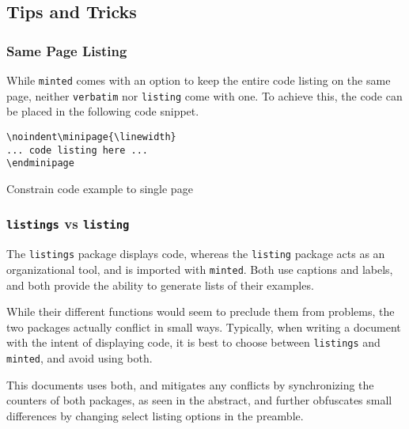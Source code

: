 
\subsection{Tips and Tricks}

\subsubsection{Same Page Listing}

While \verb|minted| comes with an option to keep the entire code listing on the same page, neither \verb|verbatim| nor \verb|listing| come with one. To achieve this, the code can be placed in the following code snippet.

\begin{listing}[H]
\begin{verbatim}
\noindent\minipage{\linewidth}
... code listing here ...
\endminipage
\end{verbatim}
\caption[Samepage Trick]{Constrain code example to single page}
\label{code:latex:same_page}
\end{listing}

\subsubsection{\texttt{listings} vs \texttt{listing}}
\label{sec:listings_vs_listing}

The \verb|listings| package displays code, whereas the \verb|listing| package acts as an organizational tool, and is imported with \verb|minted|. Both use captions and labels, and both provide the ability to generate lists of their examples.

While their different functions would seem to preclude them from problems, the two packages actually conflict in small ways. Typically, when writing a document with the intent of displaying code, it is best to choose between \verb|listings| and \verb|minted|, and avoid using both.

This documents uses both, and mitigates any conflicts by synchronizing the counters of both packages, as seen in the abstract, and further obfuscates small differences by changing select listing options in the preamble.

\newpage